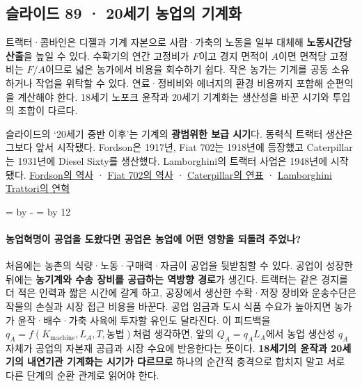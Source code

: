\documentclass[10pt,a4paper]{article}
\newcommand{\ReserveQuestionSpace}{%
  \par\begingroup
  \dimen0=\pagegoal \advance\dimen0 by -\pagetotal
  \dimen2=\baselineskip \multiply\dimen2 by 12
  \ifdim\dimen0<\dimen2 \newpage\fi
  \endgroup}
\begin{document}
\subsection{슬라이드 89 · 20세기 농업의 기계화}
트랙터·콤바인은 디젤과 기계 자본으로 사람·가축의 노동을 일부 대체해 \textbf{노동시간당 산출}을 높일 수 있다. 수확기의 연간 고정비가 $F$이고 경지 면적이 $A$이면 면적당 고정비는 $F/A$이므로 넓은 농가에서 비용을 회수하기 쉽다. 작은 농가는 기계를 공동 소유하거나 작업을 위탁할 수 있다. 연료·정비비와 에너지의 환경 비용까지 포함해 순편익을 계산해야 한다. 18세기 노포크 윤작과 20세기 기계화는 생산성을 바꾼 시기와 투입의 조합이 다르다.\par

슬라이드의 ‘20세기 중반 이후’는 기계의 \textbf{광범위한 보급 시기}다. 동력식 트랙터 생산은 그보다 앞서 시작됐다. Fordson은 1917년, Fiat 702는 1918년에 등장했고 Caterpillar는 1931년에 Diesel Sixty를 생산했다. Lamborghini의 트랙터 사업은 1948년에 시작됐다. \href{https://www.thehenryford.org/collections/explore/articles/fordson-tractor-no-100000}{Fordson의 역사} · \href{https://media.cnh.com/EMEA/new-holland/new-holland-celebrates-100-years-since-the-introduction-of-the-first-fiat-tractor-with-fiat-centenar/s/0c0261ae-f90e-4a74-8629-9ec9ec73606e}{Fiat 702의 역사} · \href{https://www.caterpillar.com/en/company/about-caterpillar/history/history-timeline.html}{Caterpillar의 연표} · \href{https://www.lamborghini-tractors.com/en-eu/history/28-1948}{Lamborghini Trattori의 연혁}\par

\ReserveQuestionSpace
\paragraph{농업혁명이 공업을 도왔다면 공업은 농업에 어떤 영향을 되돌려 주었나?}
처음에는 농촌의 식량·노동·구매력·자금이 공업을 뒷받침할 수 있다. 공업이 성장한 뒤에는 \textbf{농기계와 수송 장비를 공급하는 역방향 경로}가 생긴다. 트랙터는 같은 경지를 더 적은 인력과 짧은 시간에 갈게 하고, 공장에서 생산한 수확·저장 장비와 운송수단은 작물의 손실과 시장 접근 비용을 바꾼다. 공업 임금과 도시 식품 수요가 높아지면 농가가 윤작·배수·가축 사육에 투자할 유인도 달라진다. 이 피드백을 $q_A=f(K_{\mathrm{machine}},L_A,T,\mbox{농법})$처럼 생각하면, 앞의 $Q_A=q_A L_A$에서 농업 생산성 $q_A$ 자체가 공업의 자본재 공급과 시장 수요에 반응한다는 뜻이다. \textbf{18세기의 윤작과 20세기의 내연기관 기계화는 시기가 다르므로} 하나의 순간적 충격으로 합치지 말고 서로 다른 단계의 순환 관계로 읽어야 한다.\par
\end{document}
